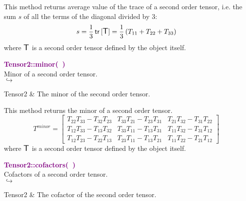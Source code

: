 This method returns average value of the trace of a second order tensor, i.e. the sum $s$ of all the terms of the diagonal divided by 3:
\begin{equation*}
s = \frac{1}{3} \mbox{\ensuremath{\mathsf{\,tr\,}}}[\mbox{\large\ensuremath{\mathsf{T}}}] =  \frac{1}{3} \left( T_{11}+T_{22}+T_{33} \right)
\end{equation*}
where $\mbox{\large\ensuremath{\mathsf{T}}}$ is a second order tensor defined by the object itself.

\textcolor{purple}{\textbf{Tensor2::minor(~)}}\label{Tensor2::minor()}\\
Minor of a second order tensor.\\ \hspace*{5mm}$\hookrightarrow$
\vspace*{-2em}\begin{tcolorbox}[grow to left by=-1cm, width=\textwidth-1cm,myArgs,tabularx={l|R}]
Tensor2 & The minor of the second order tensor.
\end{tcolorbox}

This method returns the minor of a second order tensor.
\begin{equation*}
T^{minor} = \left[\begin{array}{ccc}
T_{22}T_{33}-T_{32}T_{23} & T_{33}T_{21}-T_{23}T_{31} & T_{21}T_{32}-T_{31}T_{22}\\
T_{12}T_{33}-T_{13}T_{32} & T_{33}T_{11}-T_{13}T_{31} & T_{11}T_{32}-T_{31}T_{12}\\
T_{12}T_{23}-T_{22}T_{13} & T_{23}T_{11}-T_{13}T_{21} & T_{11}T_{22}-T_{21}T_{12}
\end{array}
\right]
\end{equation*}
where $\mbox{\large\ensuremath{\mathsf{T}}}$ is a second order tensor defined by the object itself.

\textcolor{purple}{\textbf{Tensor2::cofactors(~)}}\label{Tensor2::cofactors()}\\
Cofactors of a second order tensor.\\ \hspace*{5mm}$\hookrightarrow$
\vspace*{-2em}\begin{tcolorbox}[grow to left by=-1cm, width=\textwidth-1cm,myArgs,tabularx={l|R}]
Tensor2 & The cofactor of the second order tensor.
\end{tcolorbox}

